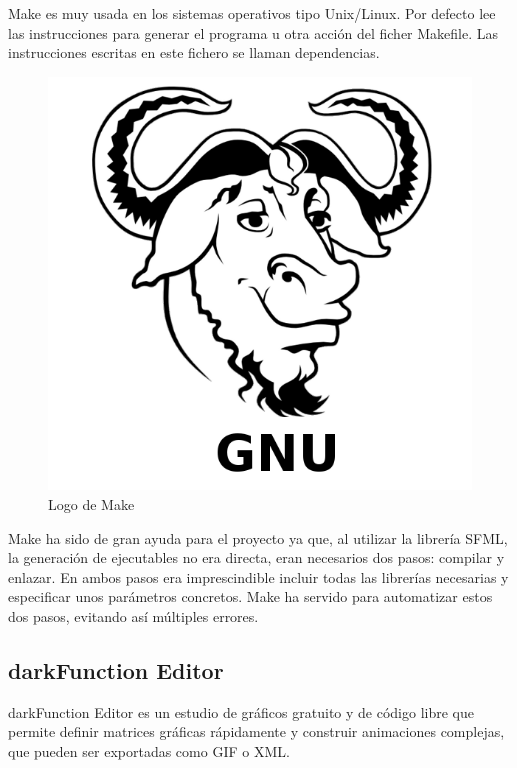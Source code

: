 		Make es muy usada en los sistemas operativos tipo Unix/Linux. Por defecto lee las instrucciones para generar el programa u otra acción del ficher Makefile. Las instrucciones escritas en este fichero se llaman dependencias.

		\begin{figure}[!htp]
			 \centering
			 \includegraphics{fig/make}
			 \caption{Logo de Make}
			 \label{fig:make}
		\end{figure}

		Make ha sido de gran ayuda para el proyecto ya que, al utilizar la librería SFML, la generación de ejecutables no era directa, eran necesarios dos pasos: compilar y enlazar. En ambos pasos era imprescindible incluir todas las librerías necesarias y especificar unos parámetros concretos. Make ha servido para automatizar estos dos pasos, evitando así múltiples errores.

	\subsection{darkFunction Editor}

		darkFunction Editor es un estudio de gráficos gratuito y de código libre que permite definir matrices gráficas rápidamente y construir animaciones complejas, que pueden ser exportadas como GIF o XML.

